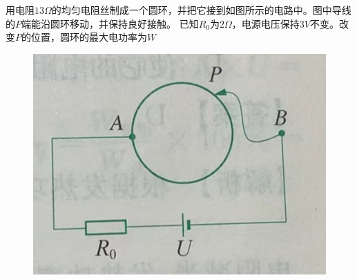 \documentclass[a4paper,cs4size]{BHCexam}
\begin{document}
\begin{groups}
\begin{questions}[]
        \question[5] 用电阻$13\Omega$的均匀电阻丝制成一个圆环，并把它接到如图所示的电路中。图中导线的$P$端能沿圆环移动，并保持良好接触。
        已知$R_0$为$2\Omega$，电源电压保持$3V$不变。改变$P$的位置，圆环的最大电功率为\underline{\quad\quad\quad\quad}$W$
        \begin{figure}[htb]
            \flushright
            \includegraphics [scale=0.4,trim=0 0 0 0]{./image/physics_circuit4_3.png}
            \label{fig:fig_circuit4_3}
        \end{figure}
        \vspace{1.5cm}


\end{questions}
\end{groups}
\end{document}
